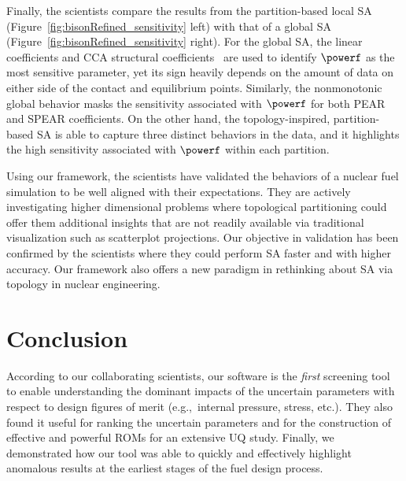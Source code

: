 Finally, the scientists compare the results from the partition-based local SA (Figure~\ref{fig:bisonRefined_sensitivity} left) with that of a global SA (Figure~\ref{fig:bisonRefined_sensitivity} right).
%
For the global SA, the linear coefficients and CCA structural coefficients~\cite{CrossnoSheadSielicki2015} are used to identify $\powerf$ as the most sensitive parameter, yet its sign heavily depends on the amount of data on either side of the contact and equilibrium points.
%
Similarly, the nonmonotonic global behavior masks the sensitivity associated with $\powerf$ for both PEAR and SPEAR coefficients.
%
On the other hand, the topology-inspired, partition-based SA is able to capture three distinct behaviors in the data, and it highlights the high sensitivity associated with $\powerf$ within each partition.

Using our framework, the scientists have validated the behaviors of a nuclear fuel simulation to be well aligned with their expectations.
%
They are actively investigating higher dimensional problems where topological partitioning could offer them additional insights that are not readily available via traditional visualization such as scatterplot projections.
%
Our objective in validation has been confirmed by the scientists where they could perform SA faster and with higher accuracy.
%
Our framework also offers a new paradigm in rethinking about SA via topology in nuclear engineering.

\section{Conclusion}
According to our collaborating scientists, our software is the \emph{first} screening tool to enable understanding the dominant impacts of the uncertain parameters with respect to design figures of merit (e.g.,\ internal pressure, stress, etc.).
%
They also found it useful for ranking the uncertain parameters and for the construction of effective and powerful ROMs for an extensive UQ study.
%
Finally, we demonstrated how our tool was able to quickly and effectively highlight anomalous results at the earliest stages of the fuel design process.

